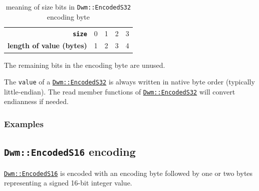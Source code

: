 \begin{table}[H]
\begin{center}
\begin{tabular}{r|l|l|l|l}
  \textbf{\texttt{size}} & 0 & 1 & 2 & 3 \\
  \textbf{length of value (bytes)} & 1 & 2 & 3 & 4  \\
\end{tabular}
\end{center}
\caption{meaning of size bits in \texttt{Dwm::EncodedS32} encoding byte}
\label{table:EncodedS32SizeBits}
\end{table}

The remaining bits in the encoding byte are unused.

The \texttt{value} of a
\hyperref[class:EncodedS32]{\texttt{Dwm::EncodedS32}} is always
written in native byte order (typically little-endian).  The read
member functions of
\hyperref[class:EncodedS32]{\texttt{Dwm::EncodedS32}} will convert
endianness if needed.

\subsubsection{Examples}







\subsection{\texttt{Dwm::EncodedS16} encoding}\label{encoding:DwmEncodedS16}
\hyperref[class:EncodedS16]{\texttt{Dwm::EncodedS16}} is encoded with
an encoding byte followed by one or two bytes representing a
signed 16-bit integer value.


